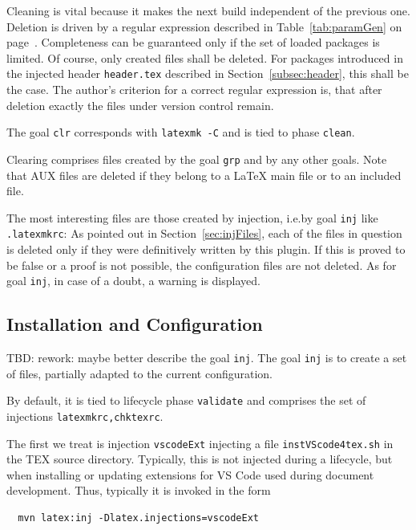 Cleaning is vital because it makes the next build independent of the previous one. 
Deletion is driven by a regular expression  
described in Table~\ref{tab:paramGen} on page~\pageref{tab:paramGen}. 
Completeness can be guaranteed only 
if the set of loaded packages is limited. 
Of course, only created files shall be deleted. 
For packages introduced in the injected header \texttt{header.tex} 
described in Section~\ref{subsec:header}, this shall be the case. 
The author's criterion for a correct regular expression is, 
that after deletion exactly the files under version control remain. 

The goal \texttt{clr} corresponds with \texttt{latexmk -C} and is tied to phase \texttt{clean}. 

Clearing comprises files created by the goal \texttt{grp} and by any other goals. 
Note that AUX files are deleted if they belong to a \LaTeX{} main file or to an included file. 

The most interesting files are those created by injection, 
i.e.\@ by goal \texttt{inj} like \texttt{.latexmkrc}: 
As pointed out in Section~\ref{sec:injFiles}, 
each of the files in question is deleted only 
if they were definitively written by this plugin. 
If this is proved to be false or a proof is not possible, 
the configuration files are not deleted. 
As for goal \texttt{inj}, in case of a doubt, a warning is displayed. 



\subsection{Installation and Configuration}\label{subsec:develConfig}

TBD\@: rework: maybe better describe the goal \texttt{inj}. 
The goal \texttt{inj} is to create a set of files, 
partially adapted to the current configuration. 



By default, it is tied to lifecycle phase \texttt{validate} 
and comprises the set of injections \texttt{latexmkrc,chktexrc}. 

The first we treat is injection \texttt{vscodeExt} 
injecting a file \texttt{instVScode4tex.sh} in the TEX source directory. 
Typically, this is not injected during a lifecycle, 
but when installing or updating extensions for VS Code 
used during document development. 
Thus, typically it is invoked in the form 
%
\begin{verbatim}
  mvn latex:inj -Dlatex.injections=vscodeExt
\end{verbatim}


